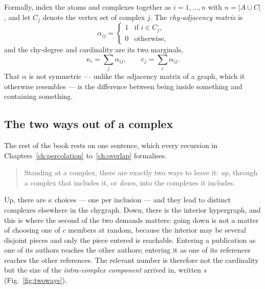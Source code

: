 Formally, index the atoms and complexes together as $i=1,\dots,n$ with
$n=|A\cup C|$, and let $C_j$ denote the vertex set of complex $j$. The
\emph{chy-adjacency matrix} is
\begin{equation}
  \alpha_{ij}=\begin{cases}1 & \text{if } i\in C_j,\\ 0 & \text{otherwise,}\end{cases}
  \label{eq:alpha}
\end{equation}
and the chy-degree and cardinality are its two marginals,
\begin{equation}
  \kappa_i=\sum_j\alpha_{ij},\qquad c_j=\sum_i\alpha_{ij}.
  \label{eq:kappa}
\end{equation}
That $\alpha$ is not symmetric --- unlike the adjacency matrix of a graph, which
it otherwise resembles --- is the difference between being inside something and
containing something.

\subsection{The two ways out of a complex}

The rest of the book rests on one sentence, which every recursion in
Chapters~\ref{ch:percolation} to~\ref{ch:overlap} formalises.

\begin{quote}
Standing at a complex, there are exactly two ways to leave it: \emph{up},
through a complex that includes it, or \emph{down}, into the complexes it
includes.
\end{quote}

Up, there are $\kappa$ choices --- one per inclusion --- and they lead to
distinct complexes elsewhere in the chygraph. Down, there is the interior
hypergraph, and this is where the second of the two demands matters:
going down is not a matter of choosing one of $c$ members at random, because the
interior may be several disjoint pieces and only the piece entered is
reachable. Entering a publication as one of its authors reaches the other
authors; entering it as one of its references reaches the other references.
The relevant number is therefore not the cardinality but the size of the
\emph{intra-complex component} arrived in, written $s$
(Fig.~\ref{fig:twoways}).

